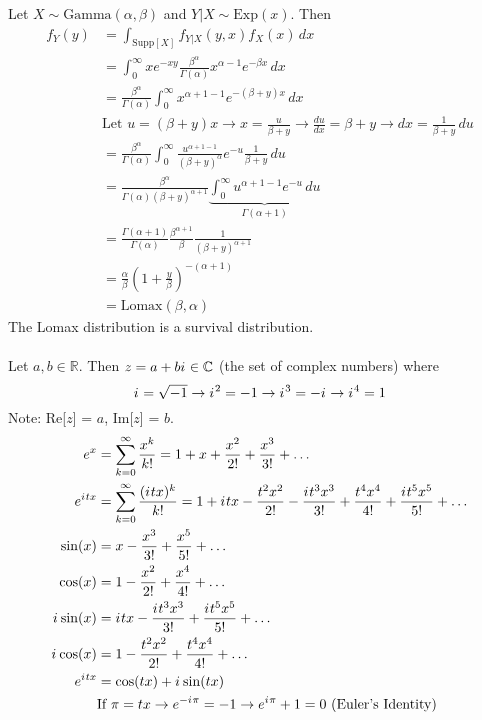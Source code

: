 \documentclass[12pt]{article}
\newcommand{\supp}[1]{\text{Supp}[ #1 ]}
\renewcommand{\i}{{i\mkern1mu}}
\begin{document}
Let $X \sim \text{Gamma}(\alpha, \beta)$ and $Y|X \sim \text{Exp}(x)$. Then $$ \begin{aligned} 
f_Y(y) &= \int_{\supp{X}} f_{Y|X}(y,x)f_X(x)\,dx \\ &= \int_0^\infty xe^{-xy} \frac{\beta^\alpha}{\Gamma(\alpha)} x^{\alpha - 1} e^{-\beta x} \, dx \\ &= \frac{\beta^\alpha}{\Gamma(\alpha)} \int_0^\infty x^{\alpha + 1 - 1} e^{-(\beta + y)x} \, dx \\ &\text{Let } u = (\beta + y)x \to x = \frac{u}{\beta + y} \to \frac{du}{dx} = \beta + y \to dx = \frac{1}{\beta + y} \, du \\ &= \frac{\beta^\alpha}{\Gamma(\alpha)} \int_0^\infty \frac{u^{\alpha + 1 - 1}}{(\beta + y)^\alpha} e^{-u} \frac{1}{\beta + y} \, du \\ &= \frac{\beta^\alpha}{\Gamma(\alpha)(\beta + y)^{\alpha + 1}} \underbrace{\int_0^\infty u^{\alpha + 1 - 1} e^{-u} \, du}_{\Gamma(\alpha + 1)} \\ &= \frac{\Gamma(\alpha + 1)}{\Gamma(\alpha)}\frac{\beta^{\alpha + 1}}{\beta}\frac{1}{(\beta + y)^{\alpha + 1}} \\ &= \frac{\alpha}{\beta}(1 + \frac{y}{\beta})^{-(\alpha + 1)} \\ &= \text{Lomax}(\beta, \alpha) \end{aligned} $$ 
The Lomax distribution is a survival distribution. \\~\\
Let $a, b \in \mathbb{R}$. Then $z = a + b\i \in \mathbb{C}$ (the set of complex numbers) where $$ \i = \sqrt{-1} \to \i^2 = -1 \to \i^3 = -\i \to \i^4 = 1 $$ 
Note: Re[$z$] = $a$, Im[$z$] = $b$. 
$$ \begin{aligned} e^x &= \sum_{k = 0}^\infty \frac{x^k}{k!} = 1 + x + \frac{x^2}{2!} + \frac{x^3}{3!} + \dots \\ e^{\i tx} &= \sum_{k = 0}^\infty \frac{(\i tx)^k}{k!} = 1 + \i tx - \frac{t^2x^2}{2!} - \frac{\i t^3x^3}{3!} + \frac{t^4x^4}{4!} + \frac{\i t^5x^5}{5!} + \dots \\ \sin(x) &= x - \frac{x^3}{3!} + \frac{x^5}{5!} + \dots \\ \cos(x) &= 1 - \frac{x^2}{2!} + \frac{x^4}{4!} + \dots \\ \i\sin(x) &= \i tx - \frac{\i t^3x^3}{3!} + \frac{\i t^5x^5}{5!} + \dots \\ \i\cos(x) &= 1-  \frac{t^2x^2}{2!} + \frac{t^4x^4}{4!} + \dots \\ e^{\i tx} &= \cos(tx) + \i\sin(tx) \\ &\text{If } \pi = tx \to e^{-\i \pi} = -1 \to e^{\i\pi} + 1 = 0 \text{ (Euler's Identity)} \end{aligned} $$ 
\end{document}
